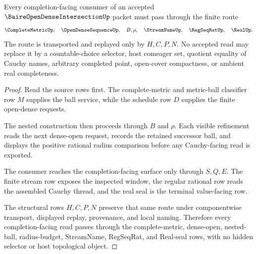 \begin{theorem}
\label{thm:baire-open-dense-intersection-nested-ball-route}
Every completion-facing consumer of an accepted $\BaireOpenDenseIntersectionUp$ packet must pass through the finite route
$$
\CompleteMetricUp,\quad
\OpenDenseSequenceUp,\quad
B,\rho,\quad
\StreamNameUp,\quad
\RegSeqRatUp,\quad
\RealUp .
$$
The route is transported and replayed only by $H,C,P,N$. No accepted read may replace it by a countable-choice selector, host comeager set, quotient equality of Cauchy names, arbitrary completed point, open-cover compactness, or ambient real completeness.
\end{theorem}
\begin{proof}
Read the source rows first. The complete-metric and metric-ball classifier row $M$ supplies the ball service, while the schedule row $D$ supplies the finite open-dense requests.

The nested construction then proceeds through $B$ and $\rho$. Each visible refinement reads the next dense-open request, records the retained successor ball, and displays the positive rational radius comparison before any Cauchy-facing read is exported.

The consumer reaches the completion-facing surface only through $S,Q,E$. The finite stream row exposes the inspected window, the regular rational row reads the assembled Cauchy thread, and the real seal is the terminal value-facing row.

The structural rows $H,C,P,N$ preserve that same route under componentwise transport, displayed replay, provenance, and local naming. Therefore every completion-facing read passes through the complete-metric, dense-open, nested-ball, radius-budget, StreamName, RegSeqRat, and Real-seal rows, with no hidden selector or host topological object.
\end{proof}

